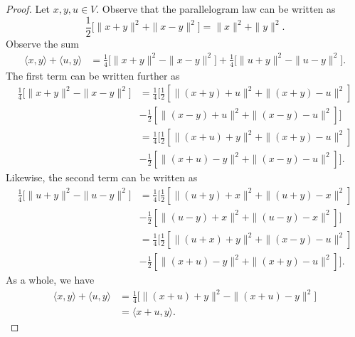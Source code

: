 \begin{enumerate}
        \begin{proof}
        Let \( x,y, u \in V  \). Observe that the parallelogram law can be written as 
        \[  \frac{ 1 }{ 2 } \Big[ \|x  + y\|^{2} + \|x - y \|^{2} \Big] = \|x\|^{2} + \|y\|^{2}. \]
        Observe the sum
        \begin{align*}
            \langle x , y \rangle + \langle u , y \rangle &= \frac{ 1 }{ 4 }  \Big[ \|x  +y\|^{2} - \|x -y\|^{2} \Big] + \frac{ 1 }{ 4 }  \Big[ \| u + y\|^{2} - \|u -y\|^{2}\Big].
        \end{align*}
        The first term can be written further as
        \begin{align*}
            \frac{ 1 }{ 4 }  \Big[ \|x + y\|^{2} - \|x-y\|^{2} \Big] &= \frac{ 1 }{ 4 }  \Big[ \frac{ 1 }{ 2 }  [ \|(x+y) + u\|^{2} + \|(x+y) - u\|^{2} ] \\
                                                                     &- \frac{ 1 }{ 2 }  [ \|(x-y) + u\|^{2} + \|(x-y) - u\|^{2}] \Big] \\
                                &= \frac{ 1 }{ 4 }  \Big[ \frac{ 1 }{ 2 }  [ \|(x+u) + y\|^{2} + \|(x+y) - u\|^{2} ] \\
                                                                     &- \frac{ 1 }{ 2 }  [ \|(x+u) - y\|^{2} + \|(x-y) - u\|^{2}] \Big].
        \end{align*}
        Likewise, the second term can be written as 
        \begin{align*}
            \frac{ 1  }{ 4  } \Big[ \|u +y\|^{2} - \|u - y\|^{2} \Big] &=   \frac{ 1 }{ 4 }  \Big[ \frac{ 1 }{ 2 }  [ \|(u+y) + x\|^{2} + \|(u+y) -x \|^{2}   ] \\
                                                                       &- \frac{ 1 }{ 2 }  [ \|(u-y) + x \|^{2} + \|(u-y) - x\|^{2}] \Big] \\
                                                                       &=   \frac{ 1 }{ 4 }  \Big[ \frac{ 1 }{ 2 }  [ \|(u+x) + y\|^{2} + \|(x-y) - u \|^{2}   ] \\
                                                                       &- \frac{ 1 }{ 2 }  [ \|(x+u) - y \|^{2} + \|(x+y) - u\|^{2}] \Big].
        \end{align*}
        As a whole, we have
        \begin{align*}
            \langle x  , y \rangle + \langle u , y \rangle &= \frac{ 1 }{ 4 } \Big[ \| (x+u) + y \|^{2} - \|(x+u) - y\|^{2} \Big] \\
            &= \langle x + u  , y \rangle.

\end{align*}
\end{proof}
\end{enumerate}
